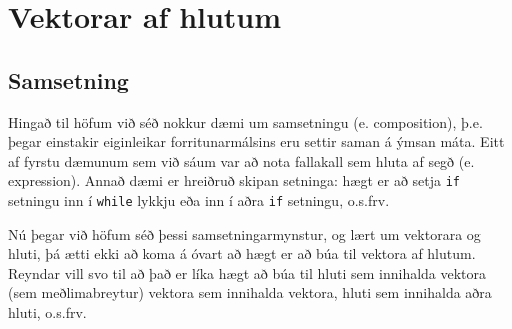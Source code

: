 





\chapter{Vektorar af hlutum}

\section{Samsetning}

Hingað til höfum við séð nokkur dæmi um samsetningu (e. composition), þ.e. þegar einstakir eiginleikar forritunarmálsins eru settir saman á ýmsan máta.
Eitt af fyrstu dæmunum sem við sáum var að nota fallakall sem hluta af segð (e. expression).
Annað dæmi er hreiðruð skipan setninga: hægt er að setja {\tt if} setningu inn í {\tt while} lykkju eða inn í aðra {\tt if} setningu, o.s.frv.

Nú þegar við höfum séð þessi samsetningarmynstur, og lært um vektorara og hluti, þá ætti ekki að koma á óvart að hægt er að búa til vektora af hlutum.
Reyndar vill svo til að það er líka hægt að búa til hluti sem innihalda vektora (sem meðlimabreytur) vektora sem innihalda vektora, hluti sem innihalda aðra hluti, o.s.frv.

